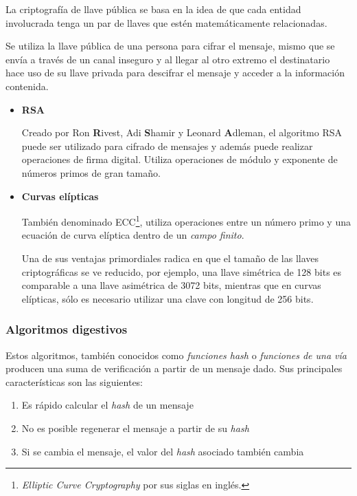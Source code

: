 La criptograf\'{i}a de llave p\'{u}blica se basa en la idea de que cada entidad involucrada tenga un par de llaves que est\'{e}n matem\'{a}ticamente relacionadas\cite{weisstein_rsa_????}.

Se utiliza la llave p\'{u}blica de una persona para cifrar el mensaje, mismo que se env\'{i}a a trav\'{e}s de un canal inseguro y al llegar al otro extremo el destinatario hace uso de su llave privada para descifrar el mensaje y acceder a la informaci\'{o}n contenida\cite{_yevgeny.pdf_????}.

      \begin{itemize}

        \item \textbf {RSA}

Creado por Ron \textbf{R}ivest, Adi \textbf{S}hamir y Leonard \textbf{A}dleman, el algoritmo \textsc{RSA} puede ser utilizado para cifrado de mensajes y adem\'{a}s puede realizar operaciones de firma digital. Utiliza operaciones de m\'{o}dulo y exponente de n\'{u}meros primos de gran tama\~{n}o\cite{weisstein_rsa_????}\cite{_slides12.dvi_????}.

        \item \textbf {Curvas el\'{i}pticas}

Tambi\'{e}n denominado \textsc{ECC}\footnote{\emph{Elliptic Curve Cryptography} por sus siglas en ingl\'{e}s.}, utiliza operaciones entre un n\'{u}mero primo y una ecuaci\'{o}n de curva el\'{i}ptica dentro de un \emph{campo finito}\cite{_safecurves:_????}.

Una de sus ventajas primordiales radica en que el tama\~{n}o de las llaves criptogr\'{a}ficas se ve reducido, por ejemplo, una llave sim\'{e}trica de 128 bits es comparable a una llave asim\'{e}trica de 3072 bits, mientras que en curvas el\'{i}pticas, s\'{o}lo es necesario utilizar una clave con longitud de 256 bits\cite{_elliptic_????}.

      \end{itemize}

\newpage
    \subsubsection {Algoritmos digestivos}

Estos algoritmos, tambi\'{e}n conocidos como \emph{funciones hash} o \emph{funciones de una v\'{i}a} producen una suma de verificaci\'{o}n a partir de un mensaje dado. Sus principales caracter\'{i}sticas son las siguientes:

\begin{enumerate}
  \setlength{\itemsep}{0.5em}
  \item Es r\'{a}pido calcular el \emph{hash} de un mensaje
  \item No es posible regenerar el mensaje a partir de su \emph{hash}
  \item Si se cambia el mensaje, el valor del \emph{hash} asociado tambi\'{e}n cambia
\end{enumerate}

